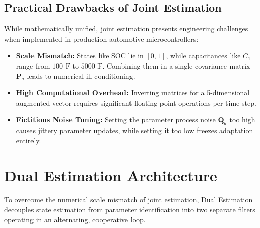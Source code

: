 \subsection{Practical Drawbacks of Joint Estimation}
While mathematically unified, joint estimation presents engineering challenges when implemented in production automotive microcontrollers:
\begin{itemize}
    \item \textbf{Scale Mismatch:} States like SOC lie in $[0, 1]$, while capacitances like $C_1$ range from $100\text{ F}$ to $5000\text{ F}$. Combining them in a single covariance matrix $\mathbf{P}_a$ leads to numerical ill-conditioning.
    \item \textbf{High Computational Overhead:} Inverting matrices for a 5-dimensional augmented vector requires significant floating-point operations per time step.
    \item \textbf{Fictitious Noise Tuning:} Setting the parameter process noise $\mathbf{Q}_{\theta}$ too high causes jittery parameter updates, while setting it too low freezes adaptation entirely.
\end{itemize}

\section{Dual Estimation Architecture}
\label{sec:dual_estimation_architecture}

To overcome the numerical scale mismatch of joint estimation, Dual Estimation decouples state estimation from parameter identification into two separate filters operating in an alternating, cooperative loop.


